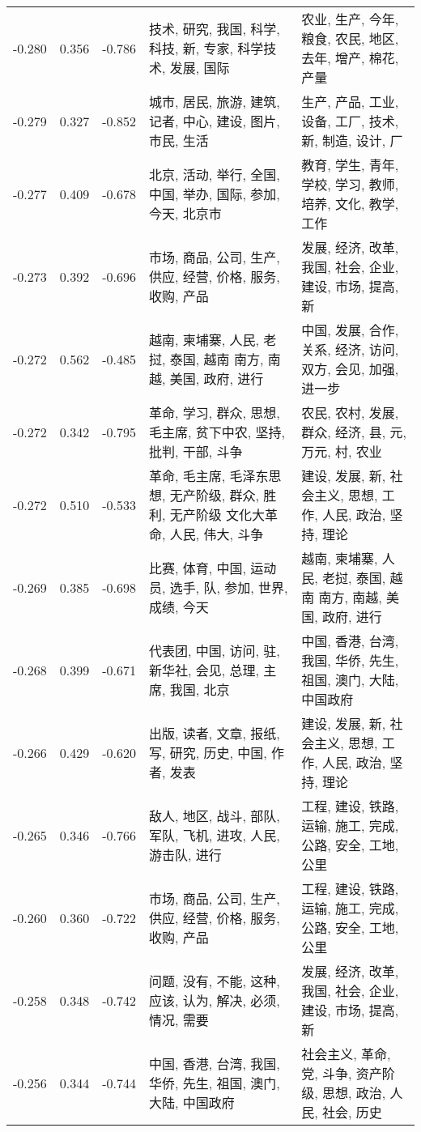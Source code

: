 \begin{tabular}{cccp{5cm}p{5cm}}
-0.280 & 0.356 & -0.786 & 技术, 研究, 我国, 科学, 科技, 新, 专家, 科学技术, 发展, 国际 & 农业, 生产, 今年, 粮食, 农民, 地区, 去年, 增产, 棉花, 产量 \\
-0.279 & 0.327 & -0.852 & 城市, 居民, 旅游, 建筑, 记者, 中心, 建设, 图片, 市民, 生活 & 生产, 产品, 工业, 设备, 工厂, 技术, 新, 制造, 设计, 厂 \\
-0.277 & 0.409 & -0.678 & 北京, 活动, 举行, 全国, 中国, 举办, 国际, 参加, 今天, 北京市 & 教育, 学生, 青年, 学校, 学习, 教师, 培养, 文化, 教学, 工作 \\
-0.273 & 0.392 & -0.696 & 市场, 商品, 公司, 生产, 供应, 经营, 价格, 服务, 收购, 产品 & 发展, 经济, 改革, 我国, 社会, 企业, 建设, 市场, 提高, 新 \\
-0.272 & 0.562 & -0.485 & 越南, 柬埔寨, 人民, 老挝, 泰国, 越南 南方, 南越, 美国, 政府, 进行 & 中国, 发展, 合作, 关系, 经济, 访问, 双方, 会见, 加强, 进一步 \\
-0.272 & 0.342 & -0.795 & 革命, 学习, 群众, 思想, 毛主席, 贫下中农, 坚持, 批判, 干部, 斗争 & 农民, 农村, 发展, 群众, 经济, 县, 元, 万元, 村, 农业 \\
-0.272 & 0.510 & -0.533 & 革命, 毛主席, 毛泽东思想, 无产阶级, 群众, 胜利, 无产阶级 文化大革命, 人民, 伟大, 斗争 & 建设, 发展, 新, 社会主义, 思想, 工作, 人民, 政治, 坚持, 理论 \\
-0.269 & 0.385 & -0.698 & 比赛, 体育, 中国, 运动员, 选手, 队, 参加, 世界, 成绩, 今天 & 越南, 柬埔寨, 人民, 老挝, 泰国, 越南 南方, 南越, 美国, 政府, 进行 \\
-0.268 & 0.399 & -0.671 & 代表团, 中国, 访问, 驻, 新华社, 会见, 总理, 主席, 我国, 北京 & 中国, 香港, 台湾, 我国, 华侨, 先生, 祖国, 澳门, 大陆, 中国政府 \\
-0.266 & 0.429 & -0.620 & 出版, 读者, 文章, 报纸, 写, 研究, 历史, 中国, 作者, 发表 & 建设, 发展, 新, 社会主义, 思想, 工作, 人民, 政治, 坚持, 理论 \\
-0.265 & 0.346 & -0.766 & 敌人, 地区, 战斗, 部队, 军队, 飞机, 进攻, 人民, 游击队, 进行 & 工程, 建设, 铁路, 运输, 施工, 完成, 公路, 安全, 工地, 公里 \\
-0.260 & 0.360 & -0.722 & 市场, 商品, 公司, 生产, 供应, 经营, 价格, 服务, 收购, 产品 & 工程, 建设, 铁路, 运输, 施工, 完成, 公路, 安全, 工地, 公里 \\
-0.258 & 0.348 & -0.742 & 问题, 没有, 不能, 这种, 应该, 认为, 解决, 必须, 情况, 需要 & 发展, 经济, 改革, 我国, 社会, 企业, 建设, 市场, 提高, 新 \\
-0.256 & 0.344 & -0.744 & 中国, 香港, 台湾, 我国, 华侨, 先生, 祖国, 澳门, 大陆, 中国政府 & 社会主义, 革命, 党, 斗争, 资产阶级, 思想, 政治, 人民, 社会, 历史 \\

\end{tabular}
